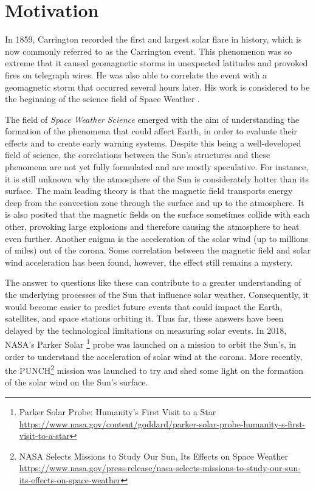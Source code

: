 
\section{Motivation} \label{sec:motivation}
In 1859, Carrington recorded the first and largest solar flare in history, which is now commonly referred to as the Carrington event. This phenomenon was so extreme that it caused geomagnetic storms in unexpected latitudes and provoked fires on telegraph wires.  He was also able to correlate the event with a geomagnetic storm that occurred several hours later. His work is considered to be the beginning of the science field of Space Weather \cite{schwenn_SpaceWeatherSolar_2006}.

The field of \textit{Space Weather Science} emerged with the aim of understanding the formation of the phenomena that could affect Earth, in order to evaluate their effects and to create early warning systems. Despite this being a well-developed field of science, the correlations between the Sun's structures and these phenomena are not yet fully formulated and are mostly speculative.  For instance, it is still unknown why the atmosphere of the Sun is considerately hotter than its surface. The main leading theory is that the magnetic field transports energy deep from the convection zone through the surface and up to the atmosphere. It is also posited that the magnetic fields on the surface sometimes collide with each other, provoking large explosions and therefore causing the atmosphere to heat even further. Another enigma is the acceleration of the solar wind (up to millions of miles) out of the corona. Some correlation between the magnetic field and solar wind acceleration has been found, however, the effect still remains a mystery.

The answer to questions like these can contribute to a greater understanding of the underlying processes of the Sun that influence solar weather. Consequently, it would become easier to predict future events that could impact the Earth, satellites, and space stations orbiting it. Thus far, these answers have been delayed by the technological limitations on measuring solar events. In 2018, NASA's Parker Solar \footnote{Parker Solar Probe: Humanity’s First Visit to a Star \url{https://www.nasa.gov/content/goddard/parker-solar-probe-humanity-s-first-visit-to-a-star}} probe was launched on a mission to orbit the Sun's, in order to understand the acceleration of solar wind at the corona. More recently, the PUNCH\footnote{NASA Selects Missions to Study Our Sun, Its Effects on Space Weather \url{https://www.nasa.gov/press-release/nasa-selects-missions-to-study-our-sun-its-effects-on-space-weather}} mission was launched to try and shed some light on the formation of the solar wind on the Sun's surface.

